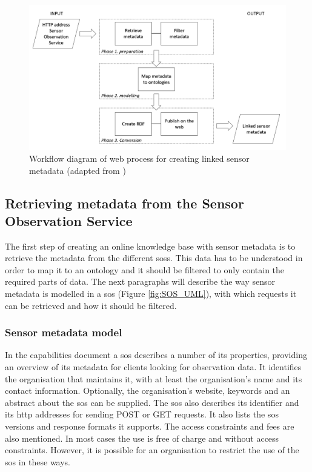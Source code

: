 \begin{figure}
	\centering
	\includegraphics[width=1\linewidth]{UML/wps1workflow.PNG}
	\caption{Workflow diagram of web process for creating linked sensor metadata (adapted from \cite{LD:Missier})}
	\label{fig:WPS1workflow}
\end{figure}

\subsection{Retrieving metadata from the Sensor Observation Service}
\label{chap:retrieveSOS}

The first step of creating an online knowledge base with sensor metadata is to retrieve the metadata from the different \aclp{sos}. This data has to be understood in order to map it to an ontology and it should be filtered to only contain the required parts of data. The next paragraphs will describe the way sensor metadata is modelled in a \ac{sos} (Figure \ref{fig:SOS_UML}), with which requests it can be retrieved and how it should be filtered. 

\subsubsection{Sensor metadata model}
In the capabilities document a \ac{sos} describes a number of its properties, providing an overview of its metadata for clients looking for observation data. It identifies the organisation that maintains it, with at least the organisation's name and its contact information. Optionally, the organisation's website, keywords and an abstract about the \ac{sos} can be supplied. The \ac{sos} also describes its identifier and its \ac{http} addresses for sending POST or GET requests. It also lists the \ac{sos} versions and response formats it supports. The access constraints and fees are also mentioned. In most cases the use is free of charge and without access constraints. However, it is possible for an organisation to restrict the use of the \ac{sos} in these ways.  

